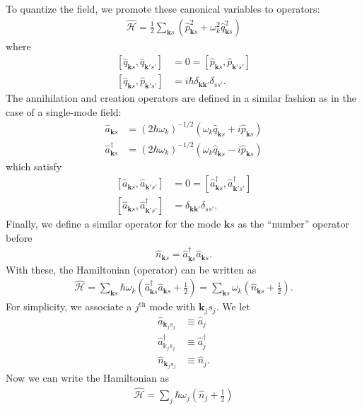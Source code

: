 \documentclass{book}
\theoremstyle{definition}
\newcommand{\ham}{\mathcal{H}}
\newcommand{\f}[2]{\frac{#1}{#2}}
\newcommand{\lp}{\left(}
\newcommand{\rp}{\right)}
\newcommand{\lb}{\left[}
\newcommand{\rb}{\right]}
\begin{document}
To quantize the field, we promote these canonical variables to operators:
\begin{align}
\boxed{\hat{\ham} = \f{1}{2}\sum_{\mathbf{k}s} \lp \hat{p}^2_{\mathbf{k}s} + \omega_k^2\hat{q}_{\mathbf{k}s}^2\rp}
\end{align}
where 
\begin{align}
\lb\hat{q}_{\mathbf{k}s}, \hat{q}_{\mathbf{k}'s'}\rb &= 0 = \lb\hat{p}_{\mathbf{k}s}, \hat{p}_{\mathbf{k}'s'}\rb \\
\lb\hat{q}_{\mathbf{k}s}, \hat{p}_{\mathbf{k}'s'}\rb &= i\hbar\delta_{\mathbf{kk}'}\delta_{ss'}.
\end{align}
The annihilation and creation operators are defined in a similar fashion as in the case of a single-mode field:
\begin{align}
\hat{a}_{\mathbf{k}s} &= (2\hbar\omega_k)^{-1/2}(\omega_k \hat{q}_{\mathbf{k}s} + i\hat{p}_{\mathbf{k}s})\\
\hat{a}^\dagger_{\mathbf{k}s} &= (2\hbar\omega_k)^{-1/2}(\omega_k \hat{q}_{\mathbf{k}s} - i\hat{p}_{\mathbf{k}s})
\end{align}
which satisfy
\begin{align}
\lb\hat{a}_{\mathbf{k}s}, \hat{a}_{\mathbf{k}'s'}\rb &= 0 = \lb\hat{a}^\dagger_{\mathbf{k}s}, \hat{a}^\dagger_{\mathbf{k}'s'}\rb\\
\lb \hat{a}_{\mathbf{k}s}, \hat{a}^\dagger_{\mathbf{k}'s'}  \rb &= \delta_{\mathbf{kk}'}\delta_{ss'}.
\end{align}
Finally, we define a similar operator for the mode $\mathbf{k}s$ as the ``number'' operator before
\begin{align}
\hat{n}_{\mathbf{k}s} = \hat{a}^\dagger_{\mathbf{k}s} \hat{a}_{\mathbf{k}s}.
\end{align}
With these, the Hamiltonian (operator) can be written as
\begin{align}
\hat{\ham} = \sum_{\mathbf{k}s}\hbar\omega_k \lp \hat{a}_{\mathbf{k}s}^\dagger\hat{a}_{\mathbf{k}s} + \f{1}{2} \rp = \sum_{\mathbf{k}s} \omega_k \lp \hat{n}_{\mathbf{k}s} +\f{1}{2} \rp.
\end{align}
For simplicity, we associate a $j^\text{th}$ mode with $\mathbf{k}_js_j$. We let
\begin{align}
\hat{a}_{\mathbf{k}_j s_j} &\equiv \hat{a}_j\\
\hat{a}^\dagger_{\mathbb{k}_j s_j} &\equiv \hat{a}^\dagger_j\\
\hat{n}_{\mathbf{k}_j s_j} &\equiv \hat{n}_j.
\end{align}
Now we can write the Hamiltonian as
\begin{align}
\boxed{\hat{\ham} = \sum_j \hbar\omega_j \lp \hat{n}_j + \f{1}{2} \rp}
\end{align}
\end{document}
